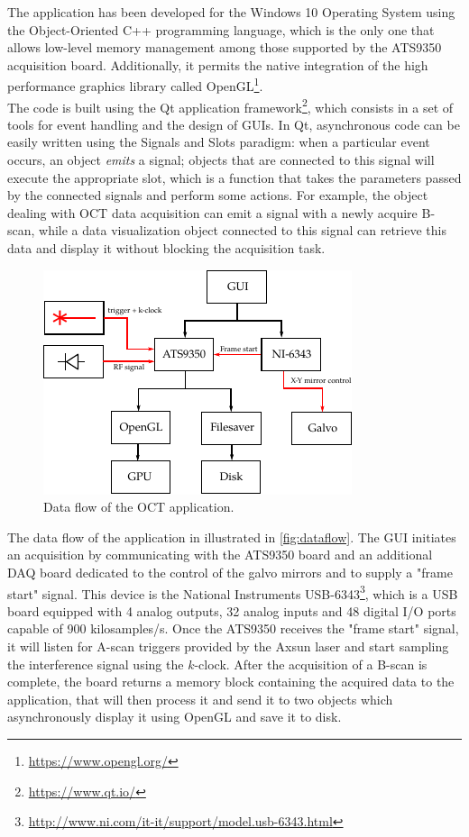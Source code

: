 
\noindent The application has been developed for the Windows 10 Operating System using the Object-Oriented C++ programming language, which is the only one that allows low-level memory management among those supported by the ATS9350 acquisition board. Additionally, it permits the native integration of the high performance graphics library called OpenGL\footnote{\url{https://www.opengl.org/}}. \\


The code is built using the Qt application framework\footnote{\url{https://www.qt.io/}}, which consists in a set of tools for event handling and the design of \acp{GUI}. In Qt, asynchronous code can be easily written using the Signals and Slots paradigm: when a particular event occurs, an object \emph{emits} a signal; objects that are connected to this signal will execute the appropriate slot, which is a function that takes the parameters passed by the connected signals and perform some actions. For example, the object dealing with OCT data acquisition can emit a signal with a newly acquire B-scan, while a data visualization object connected to this signal can retrieve this data and display it without blocking the acquisition task. 

\begin{figure}[htb]
	\myfloatalign
	\includegraphics[width=0.6\linewidth]{gfx/ch4/dataflow}
	\caption{Data flow of the OCT application.}\label{fig:dataflow}
\end{figure}

The data flow of the application in illustrated in \autoref{fig:dataflow}. The \ac{GUI} initiates an acquisition by communicating with the ATS9350 board and an additional \ac{DAQ} board dedicated to the control of the galvo mirrors and to supply a "frame start" signal. This device is the National Instruments USB-6343\footnote{\url{http://www.ni.com/it-it/support/model.usb-6343.html}}, which is a USB board equipped with 4 analog outputs, 32 analog inputs and 48 digital I/O ports capable of 900 kilosamples/s. Once the ATS9350 receives the "frame start" signal, it will listen for A-scan triggers provided by the Axsun laser and start sampling the interference signal using the $k$-clock. After the acquisition of a B-scan is complete, the board returns a memory block containing the acquired data to the application, that will then process it and send it to two objects which asynchronously display it using OpenGL and save it to disk. 

